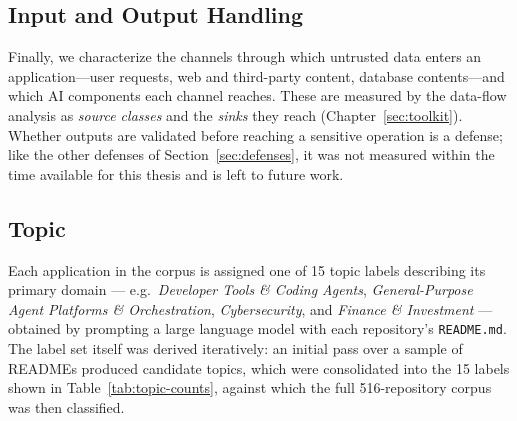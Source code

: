 \subsection{Input and Output Handling}

Finally, we characterize the channels through which untrusted data enters an application---user requests, web and third-party content, database contents---and which AI components each channel reaches. These are measured by the data-flow analysis as \emph{source classes} and the \emph{sinks} they reach (Chapter~\ref{sec:toolkit}). Whether outputs are validated before reaching a sensitive operation is a defense; like the other defenses of Section~\ref{sec:defenses}, it was not measured within the time available for this thesis and is left to future work.

\subsection{Topic}
\label{sec:application-topic}




Each application in the corpus is assigned one of 15 topic labels
describing its primary domain --- e.g.\ \emph{Developer Tools \& Coding
Agents}, \emph{General-Purpose Agent Platforms \& Orchestration},
\emph{Cybersecurity}, and \emph{Finance \& Investment} --- obtained by
prompting a large language model with each repository's \texttt{README.md}.
The label set itself was derived iteratively: an initial pass over a
sample of READMEs produced candidate topics, which were consolidated into
the 15 labels shown in Table~\ref{tab:topic-counts}, against which the full
516-repository corpus was then classified.

